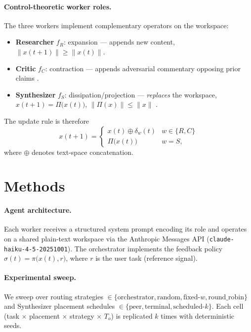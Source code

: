\documentclass{article}
\begin{document}
\paragraph{Control-theoretic worker roles.}
The three workers implement complementary operators on the workspace:
\begin{itemize}
  \item \textbf{Researcher} $f_R$: expansion — appends new content,
        $\|x(t+1)\| \geq \|x(t)\|$.
  \item \textbf{Critic} $f_C$: contraction — appends adversarial commentary
        opposing prior claims \citep{lohmiller1998contraction}.
  \item \textbf{Synthesizer} $f_S$: dissipation/projection —
        \emph{replaces} the workspace,
        $x(t+1) = \Pi\bigl(x(t)\bigr)$, $\|\Pi(x)\| \leq \|x\|$
        \citep{khalil2002nonlinear}.
\end{itemize}
The update rule is therefore
\begin{equation}
  x(t+1) =
  \begin{cases}
    x(t) \oplus \delta_w(t) & w \in \{R, C\} \\
    \Pi\!\bigl(x(t)\bigr)   & w = S,
  \end{cases}
  \label{eq:update}
\end{equation}
where $\oplus$ denotes text-space concatenation.

\section{Methods}

\paragraph{Agent architecture.}
Each worker receives a structured system prompt encoding its role and
operates on a shared plain-text workspace via the Anthropic Messages API
(\texttt{claude-haiku-4-5-20251001}).
The orchestrator implements the feedback policy
$\sigma(t) = \pi\bigl(x(t), r\bigr)$,
where $r$ is the user task (reference signal).

\paragraph{Experimental sweep.}
We sweep over routing strategies
$\in \{\text{orchestrator}, \text{random}, \text{fixed-}w, \text{round\_robin}\}$
and Synthesizer placement schedules
$\in \{\text{peer}, \text{terminal}, \text{scheduled-}k\}$.
Each cell (task $\times$ placement $\times$ strategy $\times$ $T_o$) is
replicated $k$ times with deterministic seeds.
\end{document}

